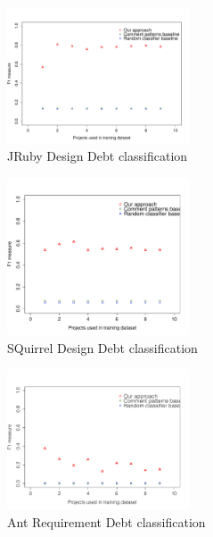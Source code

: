 \begin{figure}[thb!]
  \centering
  \includegraphics[width=0.48\textwidth]{figures/appendix/iteration_details/design_jruby.pdf}
  \vspace{-3mm}
  \caption{JRuby Design Debt classification}
  \label{fig:design_jruby}
\end{figure}

\begin{figure}[thb!]
  \centering
  \includegraphics[width=0.48\textwidth]{figures/appendix/iteration_details/design_sql12.pdf}
  \vspace{-3mm}
  \caption{SQuirrel Design Debt classification}
  \label{fig:design_sql}
\end{figure}

\clearpage
 
\begin{figure}[thb!]    
  \centering
  \includegraphics[width=0.48\textwidth]{figures/appendix/iteration_details/implementation_ant.pdf}
  \vspace{-3mm}
  \caption{Ant Requirement Debt classification}
  \label{fig:implementation_ant}
\end{figure}

